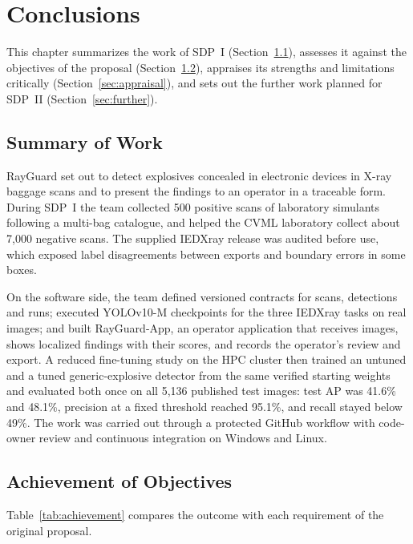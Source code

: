 \chapter{Conclusions}\label{ch:conclusions}
This chapter summarizes the work of SDP~I (Section~\ref{sec:summary}), assesses it
against the objectives of the proposal (Section~\ref{sec:achievement}), appraises
its strengths and limitations critically (Section~\ref{sec:appraisal}), and sets
out the further work planned for SDP~II (Section~\ref{sec:further}).

\section{Summary of Work}\label{sec:summary}
RayGuard set out to detect explosives concealed in electronic devices in X-ray
baggage scans and to present the findings to an operator in a traceable form.
During SDP~I the team collected 500 positive scans of laboratory simulants
following a multi-bag catalogue, and helped the CVML laboratory collect about
7,000 negative scans. The supplied IEDXray release was audited before use, which
exposed label disagreements between exports and boundary errors in some boxes.

On the software side, the team defined versioned contracts for scans, detections
and runs; executed YOLOv10-M checkpoints for the three IEDXray tasks on real
images; and built RayGuard-App, an operator application that receives images,
shows localized findings with their scores, and records the operator's review and
export. A reduced fine-tuning study on the HPC cluster then trained an untuned
and a tuned generic-explosive detector from the same verified starting weights
and evaluated both once on all 5,136 published test images: test AP was 41.6\%
and 48.1\%, precision at a fixed threshold reached 95.1\%, and recall stayed
below 49\%. The work was carried out through a
protected GitHub workflow with code-owner review and continuous integration on
Windows and Linux.

\section{Achievement of Objectives}\label{sec:achievement}
Table~\ref{tab:achievement} compares the outcome with each requirement of the
original proposal.

